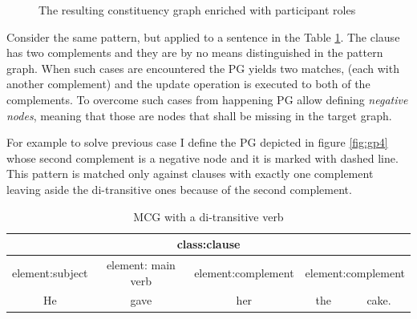 \begin{figure}[!ht]
    \centering
    \caption{The resulting constituency graph enriched with participant roles}
    \label{fig:cgg-transitive1}
\end{figure}


Consider the same pattern, but applied to a sentence in the Table \ref{tab:di-transitive1}. 
The clause has two complements and they are by no means distinguished in the pattern graph. When such cases are encountered the PG yields two matches, (each with another complement) and the update operation is executed to both of the complements. To overcome such cases from happening PG allow defining \textit{negative nodes}, meaning that those are nodes that shall be missing in the target graph.

For example to solve previous case I define the PG depicted in figure \ref{fig:gp4} whose second complement is a negative node and it is marked with dashed line. This pattern is matched only against clauses with exactly one complement leaving aside the di-transitive ones because of the second complement.

\begin{table}[ht]
\centering
\begin{tabular}{|c|c|c|c|c|}
\hline
\multicolumn{5}{|c|}{class:clause}                                                                  \\ \hline
element:subject & element: main verb & element:complement & \multicolumn{2}{c|}{element:complement} \\ \hline
He              & gave               & her                & the               & cake.               \\ \hline
\end{tabular}
\caption{MCG with a di-transitive verb}
\label{tab:di-transitive1}
\end{table}

